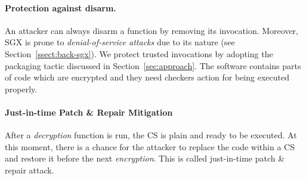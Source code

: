 \paragraph{\textbf{Protection against disarm.}}
An attacker can always disarm a function by removing its invocation.
Moreover, SGX is prone to \emph{denial-of-service attacks} due to its nature 
(see Section~\ref{ssect:back-sgx}).
We protect trusted invocations by adopting the packaging tactic discussed in 
Section~\ref{sec:approach}.
The software contains parts of code which are encrypted and they need checkers 
action for being executed properly.

\paragraph{\textbf{Just-in-time Patch \& Repair Mitigation}}

After a \emph{decryption} function is run, the CS is plain and ready to be 
executed.
At this moment, there is a chance for the attacker to replace the code within a 
CS and restore it before the next \emph{encryption}.
This is called just-in-time patch \& repair attack.

